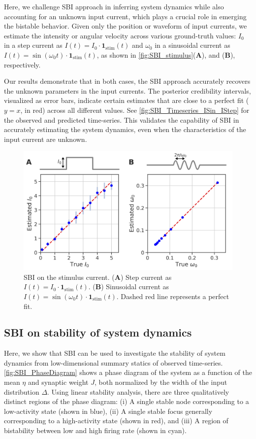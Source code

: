 \documentclass[preprint,11pt,authoryear]{elsarticle}
\begin{document}
Here, we challenge SBI approach in inferring system dynamics while also accounting for an unknown input current, which plays a crucial role in emerging the bistable behavior. Given only the position or waveform of input currents, we estimate the intensity or angular velocity across various ground-truth values: $I_0$ in a step current as $I(t)=I_0 \cdot \mathbf{1}_{\text{stim}}(t)$ and $\omega_0$ in a sinusoidal current as $I(t)=\sin (\omega_0 t) \cdot \mathbf{1}_{\text{stim}}(t)$, as shown in \autoref{fig:SBI_stimulus}(\textbf{A}), and (\textbf{B}), respectively. 

Our results demonstrate that in both cases, the SBI approach accurately recovers the unknown parameters in the input currents. The posterior credibility intervals, visualized as error bars, indicate certain estimates that are close to a perfect fit ($y=x$, in red) across all different values. See \autoref{fig:SBI_Timeseries_ISin_IStep} for the observed and predicted time-series. This validates the capability of SBI in accurately estimating the system dynamics, even when the characteristics of the input current are unknown.


\begin{figure}
    \centering
    \includegraphics[width=0.7\linewidth]{Figs/Fig7.png}
    \caption{SBI on the stimulus current. (\textbf{A}) Step current as $I(t)=I_0 \cdot \mathbf{1}_{\text{stim}}(t)$. (\textbf{B}) Sinusoidal current as $I(t)=\sin (\omega_0 t) \cdot \mathbf{1}_{\text{stim}}(t)$. Dashed red line represents a perfect fit.  }
    \label{fig:SBI_stimulus}
\end{figure}



\subsection{SBI on stability of system dynamics}

Here, we show that SBI can be used to investigate the stability of system dynamics from low-dimensional summary statics of observed time-series. \autoref{fig:SBI_PhaseDiagram} shows a phase diagram of the system as a function of the mean $\eta$ and synaptic weight $J$, both normalized by the width of the input distribution $\Delta$. Using linear stability analysis, there are three qualitatively distinct regions of the phase diagram: (i) A single stable node corresponding to a low-activity state (shown in blue), (ii) A single stable focus generally corresponding to a high-activity state (shown in red), and (iii) A region of bistability between low and high firing rate (shown in cyan).  
\end{document}
